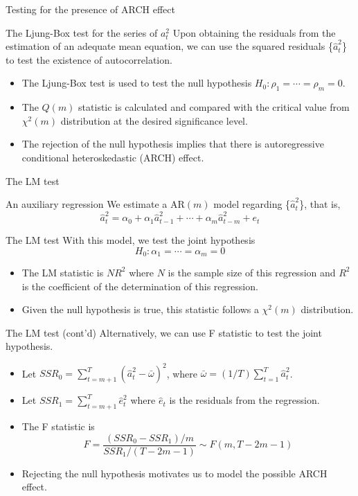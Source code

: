 \documentclass[presentation,10pt]{beamer}
\begin{document}
\begin{frame}[label={sec:orgae61183}]{Testing for the presence of ARCH effect}
\begin{block}{The Ljung-Box test for the series of \(a^2_t\)}
Upon obtaining the residuals from the estimation
of an adequate mean equation, we can use the squared residuals
\{\(\hat{a}_t^2\)\} to test the existence of autocorrelation. 
\begin{itemize}
\item The Ljung-Box test is used to test the null hypothesis
\(H_0: \rho_1 = \cdots = \rho_m = 0\).
\item The \(Q(m)\) statistic is
calculated and compared with the critical value from \(\chi^2(m)\)
distribution at the desired significance level.
\item The rejection of the
null hypothesis implies that there is autoregressive conditional
heteroskedastic (ARCH) effect.
\end{itemize}
\end{block}
\end{frame}

\begin{frame}[label={sec:org384b386}]{The LM test}
\begin{block}{An auxiliary regression}
We estimate a AR\((m)\) model regarding \{\(\hat{a}^2_t\)\}, that is,
\[ \hat{a}^2_t = \alpha_0 + \alpha_1 \hat{a}_{t-1}^2 + \cdots +
\alpha_m \hat{a}^2_{t-m} + e_t \]
\end{block}

\begin{block}{The LM test}
With this model, we test the joint hypothesis
\[H_0: \alpha_1 = \cdots = \alpha_m = 0 \]
\begin{itemize}
\item The LM statistic is \(NR^2\) where \(N\) is the sample size of this
regression and \(R^2\) is the coefficient of the determination of this
regression.
\item Given the null hypothesis is true, this statistic follows
a \(\chi^2(m)\) distribution.
\end{itemize}
\end{block}
\end{frame}

\begin{frame}[label={sec:org051a076}]{The LM test (cont'd)}
Alternatively, we can use F statistic to test the joint
hypothesis. 
\begin{itemize}
\item Let \(SSR_0 = \sum_{t=m+1}^{T} (\hat{a}^2_{t} -
  \bar{\omega})^2\), where \(\bar{\omega} = (1/T) \sum_{t=1}^T
  \hat{a}^2_t\).
\item Let \(SSR_1 = \sum_{t=m+1}^T \hat{e}^2_t\) where \(\hat{e}_t\) is the
residuals from the regression.
\item The F statistic is
\[F = \frac{(SSR_0 - SSR_1)/m}{SSR_1/(T-2m-1)} \sim F(m, T-2m-1)\]
\item Rejecting the null hypothesis motivates us to model the possible
ARCH effect.
\end{itemize}
\end{frame}
\end{document}
